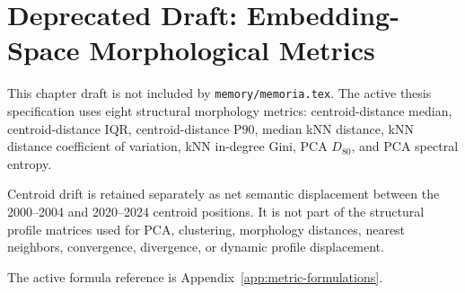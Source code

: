 
\section{Deprecated Draft: Embedding-Space Morphological Metrics}

This chapter draft is not included by \texttt{memory/memoria.tex}. The active
thesis specification uses eight structural morphology metrics: centroid-distance
median, centroid-distance IQR, centroid-distance P90, median kNN distance, kNN
distance coefficient of variation, kNN in-degree Gini, PCA \(D_{80}\), and PCA
spectral entropy.

Centroid drift is retained separately as net semantic displacement between the
2000--2004 and 2020--2024 centroid positions. It is not part of the structural
profile matrices used for PCA, clustering, morphology distances, nearest
neighbors, convergence, divergence, or dynamic profile displacement.

The active formula reference is Appendix~\ref{app:metric-formulations}.
